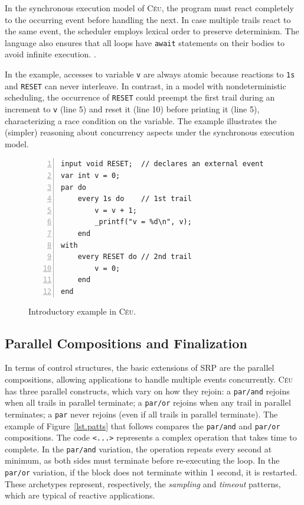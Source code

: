 \documentclass{acm_proc_article-sp}
\newcommand{\CEU}{\textsc{C\'{e}u}\xspace}
\newcommand{\code}[1] {{\small{\texttt{#1}}}}
\newcommand{\1}{\;}
\newcommand{\2}{\;\;}
\newcommand{\3}{\;\;\;}
\newcommand{\5}{\;\;\;\;\;}
\begin{document}
In the synchronous execution model of \CEU, the program must react completely 
to the occurring event before handling the next.
%
In case multiple trails react to the same event, the scheduler employs lexical 
order to preserve determinism.
%
The language also ensures that all loops have \code{await} statements on their 
bodies to avoid infinite execution.
\cite{ceu.sensys13}.

In the example, accesses to variable \code{v} are always atomic because 
reactions to \code{1s} and \code{RESET} can never interleave.
%
In contrast, in a model with nondeterministic scheduling, the occurrence of 
\code{RESET} could preempt the first trail during an increment to \code{v} 
(line 5) and reset it (line 10) before printing it (line 5), characterizing a 
race condition on the variable.
%
The example illustrates the (simpler) reasoning about concurrency aspects under 
the synchronous execution model.

\begin{figure}[t]
\begin{lstlisting}[numbers=left,xleftmargin=3em]
input void RESET;  // declares an external event
var int v = 0;
par do
    every 1s do    // 1st trail
        v = v + 1;
        _printf("v = %d\n", v);
    end
with
    every RESET do // 2nd trail
        v = 0;
    end
end
\end{lstlisting}
\caption{ Introductory example in \CEU.
\label{lst.intro}
}
\end{figure}

\subsection{Parallel Compositions and Finalization}

In terms of control structures, the basic extensions of SRP are the parallel 
compositions, allowing applications to handle multiple events concurrently.
%
\CEU has three parallel constructs, which vary on how they rejoin:
a \code{par/and} rejoins when all trails in parallel terminate;
a \code{par/or} rejoins when any trail in parallel terminates;
a \code{par} never rejoins (even if all trails in parallel terminate).
%
The example of Figure~\ref{lst.patts} that follows compares the \code{par/and} 
and \code{par/or} compositions.
%
The code \code{<...>} represents a complex operation that takes time to 
complete.
%
In the \code{par/and} variation, the operation repeats every second at minimum, 
as both sides must terminate before re-executing the loop.
In the \code{par/or} variation, if the block does not terminate within 1 
second, it is restarted.
%
These archetypes represent, respectively, the \emph{sampling} and 
\emph{timeout} patterns, which are typical of reactive applications.
\end{document}
